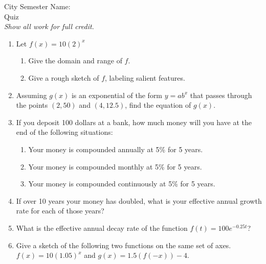 \documentclass[12pt]{article}
\theoremstyle{plain}     %
\begin{document}
\large
City Semester  \hspace{8cm} Name:\makebox[6cm]{\hrulefill}
\\
Quiz\\
\normalsize 
\emph{Show all work for full credit.}\\
\begin{enumerate}
	\item Let $f(x)=10(2)^x$
		\begin{enumerate}
			\item Give the domain and range of $f$.\\[2cm]
			\item Give a rough sketch of $f$, labeling salient features.\\[4cm]
		\end{enumerate}
		
	\item Assuming $g(x)$ is an exponential of the form $y=ab^x$ that passes through the points $(2,50)$ and $(4,12.5)$, find the equation of $g(x)$.\\[3cm]
	\item If you deposit 100 dollars at a bank, how much money will you have at the end of the following situations:
		\begin{enumerate}
			\item Your money is compounded annually at 5\% for 5 years.\\[4cm]
			\item Your money is compounded monthly at 5\% for 5 years.\\[3cm]
			\item Your money is compounded continuously at 5\% for 5 years.\\[3cm]
			
		\end{enumerate}
	\item If over 10 years your money has doubled, what is your effective annual growth rate for each of those years?\\[3cm]
	\item What is the effective annual decay rate of the function $f(t)=100e^{-0.25t}$?\\[2cm]
	\item Give a sketch of the following two functions on the same set of axes. $f(x)=10(1.05)^x$ and $g(x)=1.5(f(-x))-4$.			  			
\end{enumerate}
	
\end{document}
